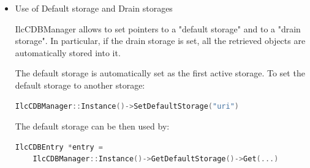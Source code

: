 \documentclass[12pt,a4paper,twoside]{article}
\newcommand{\method}[1]{\texttt{#1}\xspace}
\begin{document}
{\begin{itemize}
\begin{itemize}
\begin{lstlisting}[language=C++]
      // specifying the version: I want version 2
      IlcCDBEntry* entry = sto->Get("ZDC/Calib/Pedestals",5,2)

      // specifying version and subversion: I want version 2 and subVersion 1
      IlcCDBEntry* entry = sto->Get("ZDC/Calib/Pedestals",5,2,1)
    \end{lstlisting}

  \item Selection criteria can be also specified using 
    \method{IlcCDBStorage::AddSelection(...)} methods:

    \begin{lstlisting}[language=C++]
      // I want version 2\_1 for all "ZDC/Calib/*" objects for runs 1-100
      sto->AddSelection("ZDC/Calib/*",1,100,2,1);
      // and I want version 1\_0 for "ZDC/Calib/Pedestals" objects for runs 5-10
      sto->AddSelection("ZDC/Calib/Pedestals",5,10,1,0)
      
      IlcCDBEntry* entry = sto->Get("ZDC/Calib/Pedestals",5)
    \end{lstlisting}

    See also: \method{IlcCDBStorage::RemoveSelection(...),
      RemoveAllSelections(), PrintSelectionList()}

  \item Retrieval of multiple objects with \method{IlcCDBStorage::GetAll()}

    \begin{lstlisting}[language=C++]
      TList *list = sto->GetAll("ZDC/*",5)
    \end{lstlisting}
  \end{itemize}

\item Use of Default storage and Drain storages

  IlcCDBManager allows to set pointers to a "default storage" and to a 
  "drain storage". In particular, if the drain storage is set, all the 
  retrieved objects are automatically stored into it.

  The default storage is automatically set as the first active storage. To 
  set the default storage to another storage:

  \begin{lstlisting}[language=C++]
    IlcCDBManager::Instance()->SetDefaultStorage("uri")
  \end{lstlisting}

  The default storage can be then used by:
  \begin{lstlisting}[language=C++]
    IlcCDBEntry *entry =
    IlcCDBManager::Instance()->GetDefaultStorage()->Get(...)  
  \end{lstlisting}


\end{itemize}}
\end{document}
